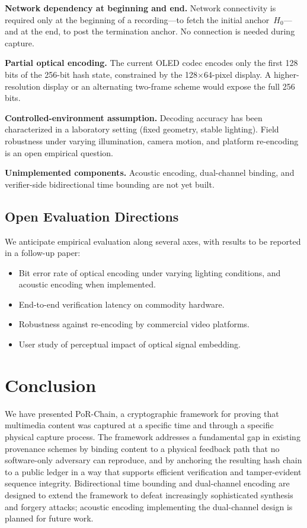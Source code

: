 \documentclass[11pt]{article}
\begin{document}
\textbf{Network dependency at beginning and end.} Network connectivity is required
only at the beginning of a recording---to fetch the initial anchor~$H_0$---and at
the end, to post the termination anchor. No connection is needed during capture.

\textbf{Partial optical encoding.} The current OLED codec encodes only the first
128 bits of the 256-bit hash state, constrained by the 128$\times$64-pixel
display. A higher-resolution display or an alternating two-frame scheme would
expose the full 256 bits.

\textbf{Controlled-environment assumption.} Decoding accuracy has been
characterized in a laboratory setting (fixed geometry, stable lighting). Field
robustness under varying illumination, camera motion, and platform re-encoding
is an open empirical question.

\textbf{Unimplemented components.} Acoustic encoding, dual-channel binding,
and verifier-side bidirectional time bounding are not yet built.

\subsection{Open Evaluation Directions}

We anticipate empirical evaluation along several axes, with results to be reported
in a follow-up paper:
\begin{itemize}
  \item Bit error rate of optical encoding under varying lighting conditions, and
    acoustic encoding when implemented.
  \item End-to-end verification latency on commodity hardware.
  \item Robustness against re-encoding by commercial video platforms.
  \item User study of perceptual impact of optical signal embedding.
\end{itemize}

\section{Conclusion}

We have presented PoR-Chain, a cryptographic framework for proving that multimedia
content was captured at a specific time and through a specific physical capture
process. The framework addresses a fundamental gap in existing provenance
schemes by binding content to a physical feedback path that no software-only
adversary can reproduce, and by anchoring the resulting hash chain to a public ledger
in a way that supports efficient verification and tamper-evident sequence integrity.
Bidirectional time bounding and dual-channel encoding are designed to extend the
framework to defeat increasingly sophisticated synthesis and forgery attacks;
acoustic encoding implementing the dual-channel design is planned for future work.
\end{document}
